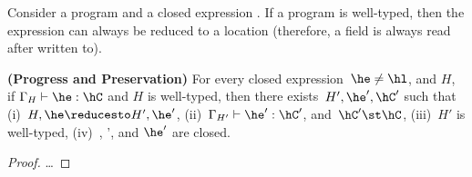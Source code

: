 \documentclass[9pt,a4paper]{article}
\begin{document}
Consider a program \hP and a closed expression \he.
If a program is well-typed, then the expression can always be reduced to a location
    (therefore, a field is always read after written to).


\begin{Theorem}[preservation]
  \textbf{(Progress and Preservation)}
    For every closed expression~$\he \neq \hl$, and $H$,
        if $\Gamma_{H} \vdash \he : \hC$ and $H$ is well-typed,
        then there exists~$H',\he',\hC'$ such that
        (i)~$H,\he \reducesto H',\he'$,
        (ii)~$\Gamma_{H'} \vdash \he':\hC'$,
        and~$\hC' \st \hC$,
        (iii)~$H'$ is well-typed,
        (iv)~\hC, \hC', and $\he'$ are closed.
\end{Theorem}
\begin{proof}
\ldots
\end{proof}
\end{document}
